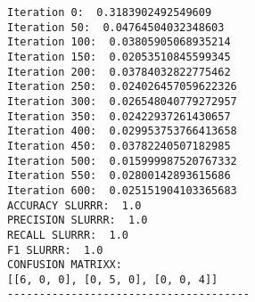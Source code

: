 \documentclass[11pt]{article}
\begin{document}
    \begin{Verbatim}[commandchars=\\\{\}]
Iteration 0:  0.3183902492549609
Iteration 50:  0.04764504032348603
Iteration 100:  0.03805905068935214
Iteration 150:  0.02053510845599345
Iteration 200:  0.03784032822775462
Iteration 250:  0.024026457059622326
Iteration 300:  0.026548040779272957
Iteration 350:  0.02422937261430657
Iteration 400:  0.029953753766413658
Iteration 450:  0.03782240507182985
Iteration 500:  0.015999987520767332
Iteration 550:  0.02800142893615686
Iteration 600:  0.025151904103365683
ACCURACY SLURRR:  1.0
PRECISION SLURRR:  1.0
RECALL SLURRR:  1.0
F1 SLURRR:  1.0
CONFUSION MATRIXX: 
[[6, 0, 0], [0, 5, 0], [0, 0, 4]]
--------------------------------------

    \end{Verbatim}
\end{document}
